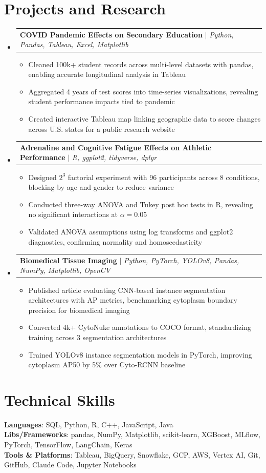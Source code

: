 \documentclass[letterpaper,11pt]{article}
\makeatletter
\newcommand{\resumeItem}[1]{
  \item\small{#1}
}
\newcommand{\resumeProjectHeading}[2]{
    \item
    \begin{tabular*}{\textwidth}{l@{\extracolsep{\fill}}r}
      #1 & #2 \\
    \end{tabular*}\vspace{-7pt}
}
\newcommand{\resumeSubHeadingListStart}{\begin{itemize}[leftmargin=0in, label={}]}
\newcommand{\resumeSubHeadingListEnd}{\end{itemize}}
\newcommand{\resumeItemListStart}{\begin{itemize}[itemsep= 1.5pt, parsep=0pt]}
\newcommand{\resumeItemListEnd}{\end{itemize}\vspace{-5pt}}
\makeatother
\begin{document}
\section{Projects and Research}
    \resumeSubHeadingListStart
      \resumeProjectHeading
          {\textbf{COVID Pandemic Effects on Secondary Education} $|$ \textit{Python, Pandas, Tableau, Excel, Matplotlib}}{}
          \resumeItemListStart
            \resumeItem{Cleaned 100k+ student records across multi-level datasets with pandas, enabling accurate longitudinal analysis in Tableau}
            \resumeItem{Aggregated 4 years of test scores into time-series visualizations, revealing student performance impacts tied to pandemic}
            \resumeItem{Created interactive Tableau map linking geographic data to score changes across U.S. states for a public research website}
          \resumeItemListEnd
      \resumeProjectHeading
          {\textbf{Adrenaline and Cognitive Fatigue Effects on Athletic Performance} $|$ \textit{R, ggplot2, tidyverse, dplyr}}{}
          \resumeItemListStart
            \resumeItem{Designed $2^3$ factorial experiment with 96 participants across 8 conditions, blocking by age and gender to reduce variance}
            \resumeItem{Conducted three-way ANOVA and Tukey post hoc tests in R, revealing no significant interactions at $\alpha = 0.05$}
            \resumeItem{Validated ANOVA assumptions using log transforms and ggplot2 diagnostics, confirming normality and homoscedasticity}
          \resumeItemListEnd
      \resumeProjectHeading
          {\textbf{Biomedical Tissue Imaging} $|$ \textit{Python, PyTorch, YOLOv8, Pandas, NumPy, Matplotlib, OpenCV}}{}
          \resumeItemListStart
            \resumeItem{Published article evaluating CNN-based instance segmentation architectures with AP metrics, benchmarking cytoplasm boundary precision for biomedical imaging}
            \resumeItem{Converted 4k+ CytoNuke annotations to COCO format, standardizing training across 3 segmentation architectures}
            \resumeItem{Trained YOLOv8 instance segmentation models in PyTorch, improving cytoplasm AP50 by 5\% over Cyto-RCNN baseline}
          \resumeItemListEnd
    \resumeSubHeadingListEnd
\section{Technical Skills}
 \begin{itemize}[leftmargin=0in, label={}]
    \small{\item{
     \textbf{Languages}{: SQL, Python, R, C++, JavaScript, Java} \\
     \textbf{Libs/Frameworks}{: pandas, NumPy, Matplotlib, scikit-learn, XGBoost, MLflow, PyTorch, TensorFlow, LangChain, Keras} \\
     \textbf{Tools \& Platforms}{: Tableau, BigQuery, Snowflake, GCP, AWS, Vertex AI, Git, GitHub, Claude Code, Jupyter Notebooks}
    }}
 \end{itemize}
\end{document}
